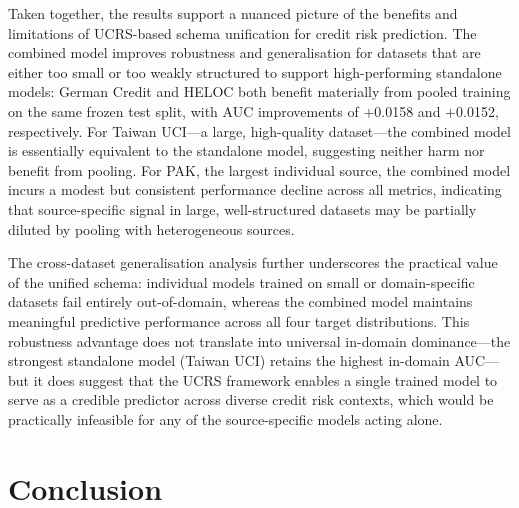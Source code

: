 \documentclass[onecolumn]{IEEEtai}
\begin{document}
Taken together, the results support a nuanced picture of the benefits and limitations of UCRS-based schema unification for credit risk prediction. The combined model improves robustness and generalisation for datasets that are either too small or too weakly structured to support high-performing standalone models: German Credit and HELOC both benefit materially from pooled training on the same frozen test split, with AUC improvements of $+$0.0158 and $+$0.0152, respectively. For Taiwan UCI---a large, high-quality dataset---the combined model is essentially equivalent to the standalone model, suggesting neither harm nor benefit from pooling. For PAK, the largest individual source, the combined model incurs a modest but consistent performance decline across all metrics, indicating that source-specific signal in large, well-structured datasets may be partially diluted by pooling with heterogeneous sources.

The cross-dataset generalisation analysis further underscores the practical value of the unified schema: individual models trained on small or domain-specific datasets fail entirely out-of-domain, whereas the combined model maintains meaningful predictive performance across all four target distributions. This robustness advantage does not translate into universal in-domain dominance---the strongest standalone model (Taiwan UCI) retains the highest in-domain AUC---but it does suggest that the UCRS framework enables a single trained model to serve as a credible predictor across diverse credit risk contexts, which would be practically infeasible for any of the source-specific models acting alone.

\vspace{-4pt}
\section{Conclusion}\vspace{-4pt}
\end{document}
